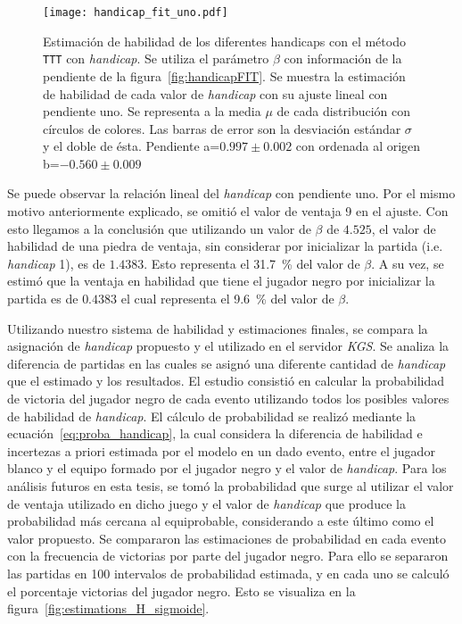 \documentclass[11pt,twoside, spanish]{report} %
\begin{document}
\begin{figure}[H]
	\centering
    \texttt{[image: handicap\_fit\_uno.pdf]}
    \caption{Estimaci\'on de habilidad de los diferentes handicaps con el m\'etodo \texttt{TTT} con \textit{handicap}. Se utiliza el par\'ametro $\beta$ con informaci\'on de la pendiente de la figura~\ref{fig:handicapFIT}. Se muestra la estimaci\'on de habilidad de cada valor de \textit{handicap} con su ajuste lineal con pendiente uno. Se representa a la media $\mu$ de cada distribuci\'on con c\'irculos de colores.  Las barras de error son la desviaci\'on est\'andar $\sigma$ y el doble de \'esta.  Pendiente a=$0.997\pm0.002$ con ordenada al origen b=$-0.560\pm0.009$}
    \label{fig:handicap_fit_uno}
\end{figure}


Se puede observar la relaci\'on lineal del \textit{handicap} con pendiente uno.
Por el mismo motivo anteriormente explicado, se omiti\'o el valor de ventaja 9 en el ajuste.
Con esto llegamos a la conclusi\'on que utilizando un valor de $\beta$ de $4.525$, el valor de habilidad de una piedra de ventaja, sin considerar por inicializar la partida (i.e. \textit{handicap} 1), es de $1.4383$.
Esto representa el \SI{31.7}{\percent} del valor de $\beta$.
A su vez, se estim\'o que la ventaja en habilidad que tiene el jugador negro por inicializar la partida es de $0.4383$ el cual representa el \SI{9.6}{\percent} del valor de $\beta$.

Utilizando nuestro sistema de habilidad y estimaciones finales,  se compara la asignaci\'on de \textit{handicap} propuesto y el utilizado en el servidor \textit{KGS}.
Se analiza la diferencia de partidas en las cuales se asign\'o una diferente cantidad de \textit{handicap} que el estimado y los resultados.
El estudio consisti\'o en calcular la probabilidad de victoria del jugador negro de cada evento utilizando todos los posibles valores de habilidad de \textit{handicap}.
El c\'alculo de probabilidad se realiz\'o mediante la ecuaci\'on~\ref{eq:proba_handicap}, la cual considera la diferencia de habilidad e incertezas a priori estimada por el modelo en un dado evento, entre el jugador blanco y el equipo formado por el jugador negro y el valor de \textit{handicap}.
Para los an\'alisis futuros en esta tesis, se tom\'o la probabilidad que surge al utilizar el valor de ventaja utilizado en dicho juego y el valor de \textit{handicap} que produce la probabilidad m\'as cercana al equiprobable, considerando a este \'ultimo como el valor propuesto.
Se compararon las estimaciones de probabilidad en cada evento con la frecuencia de victorias por parte del jugador negro.
Para ello se separaron las partidas en 100 intervalos de probabilidad estimada, y en cada uno se calcul\'o el porcentaje victorias del jugador negro.
Esto se visualiza en la figura~\ref{fig:estimations_H_sigmoide}.
\end{document}
